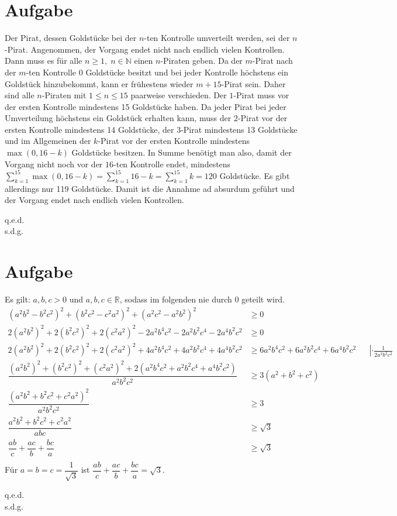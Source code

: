 \documentclass{article}
\newcommand{\myqed}{\begin{flushright} q.e.d.\\ s.d.g.\end{flushright}}
\begin{document}
    \section{Aufgabe}
    Der Pirat, dessen Goldstücke bei der $n$-ten Kontrolle umverteilt werden, sei der $n$-Pirat. Angenommen, der Vorgang endet nicht nach endlich vielen Kontrollen. Dann muss es für alle $n\geq 1,\; n\in \mathbb{N}$ einen $n$-Piraten geben. Da der $m$-Pirat nach der $m$-ten Kontrolle $0$ Goldstücke besitzt und bei jeder Kontrolle höchstens ein Goldstück hinzubekommt, kann er frühestens wieder $m+15$-Pirat sein. Daher sind alle $n$-Piraten mit $1\leq n\leq 15$ paarweise verschieden. Der $1$-Pirat muss vor der ersten Kontrolle mindestens 15 Goldstücke haben. Da jeder Pirat bei jeder Umverteilung höchstens ein Goldstück erhalten kann, muss der $2$-Pirat vor der ersten Kontrolle mindestens 14 Goldstücke, der $3$-Pirat mindestens 13 Goldstücke und im Allgemeinen der $k$-Pirat vor der ersten Kontrolle mindestens $\max(0,16-k)$ Goldstücke besitzen.
    In Summe benötigt man also, damit der Vorgang nicht noch vor der $16$-ten Kontrolle endet, mindestens $\sum_{k = 1}^{15}	 \max(0,16-k)= \sum_{k = 1}^{15} 16-k =  \sum_{k = 1}^{15} k =  120$ Goldstücke.
    Es gibt allerdings nur 119 Goldstücke. Damit ist die Annahme ad absurdum geführt und der Vorgang endet nach endlich vielen Kontrollen.\myqed
    \newpage
    \section{Aufgabe}
    Es gilt: $a,b,c>0$ und $a,b,c \in \mathbb{R}$, sodass im folgenden nie durch 0 geteilt wird.
    \begin{align*}
        (a^2b^2-b^2c^2)^2+(b^2c^2-c^2a^2)^2+(a^2c^2-a^2b^2)^2&\geq 0\\
        2(a^2b^2)^2+2(b^2c^2)^2+2(c^2a^2)^2 - 2a^2b^4c^2-2a^2b^2c^4-2a^4b^2c^2&\geq 0\\
        2(a^2b^2)^2+2(b^2c^2)^2+2(c^2a^2)^2+4a^2b^4c^2+4a^2b^2c^4+4a^4b^2c^2&\geq 6a^2b^4c^2+6a^2b^2c^4+6a^4b^2c^2&&\left|\cdot \frac{1}{2a^2b^2c^2}\right.\\
        \dfrac{(a^2b^2)^2+(b^2c^2)^2+(c^2a^2)^2+ 2\left(a^2b^4c^2+a^2b^2c^4+a^4b^2c^2\right)}{a^2b^2c^2}&\geq 3\left(a^2+b^2+c^2\right)\\
        \dfrac{\left(a^2b^2+b^2c^2+c^2a^2\right)^2}{a^2b^2c^2} &\geq 3\\
        \dfrac{a^2b^2+b^2c^2+c^2a^2}{abc} &\geq \sqrt{3}\\
        \dfrac{a b}{c} + \dfrac{a c}{b} + \dfrac{b c}{a} &\geq \sqrt{3}\\
    \end{align*}
    Für $a=b=c=\dfrac{1}{\sqrt{3}}$ ist $\dfrac{a b}{c} + \dfrac{a c}{b} + \dfrac{b c}{a} = \sqrt{3}$.\myqed
    \newpage
\end{document}
